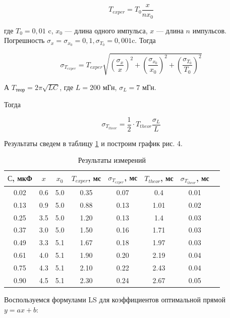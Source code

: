 \begin{equation}\label{}
T_{exper} = T_0 \frac{x}{nx_0}
\end{equation}

где $ T_0 = 0,01 $ c, $ x_0 $ --- длина одного импульса, $ x $ --- длина $ n $ импульсов. Погрешность $ \sigma_x = \sigma_{x_0} = 0,1, \sigma_{T_0} = 0,001  $c. Тогда 

\begin{equation}\label{}
\sigma_{T_{exper}} = T_{exper}\sqrt{ \left( \frac{ \sigma_x}{x} \right)^2 + \left( \frac{ \sigma_{x_0}}{x_0} \right)^2  +  \left( \frac{ \sigma_{T_0}}{T_0} \right)^2}
\end{equation}

А $ T_{теор} = 2\pi\sqrt{LC} $, где ${L = 200}$ мГн, $ \sigma_L = 7 $ мГн.

Тогда 

\begin{equation}\label{}
	\sigma_{T_{theor}} = \frac{1}{2}\cdot{T_{theor}} \frac{\sigma_L}{L}
\end{equation}

Результаты сведем в таблицу \ref{resT} и построим график рис. 4. 

\begin{table}[h!]
	\centering
	\caption{Результаты измерений}
	\begin{tabular}{|c|c|c|c|c|c|c|c|}
		\hline
		$С$, мкФ & $x$ & $x_0$ & $T_{exper}$, мс & $\sigma_{T_{exper}}$, мс & $T_{theor}$, мс & $ \sigma_{T_{theor}} $, мс \\
		\hline
		0.02 & 0.6 & 5.0 & 0.35 & 0.07 & 0.4 & 0.01 \\
		0.13 & 0.9 & 5.0 & 0.88 & 0.13 & 1.01 & 0.02 \\
		0.25 & 3.5 & 5.0 & 1.20 & 0.13 & 1.4 & 0.03 \\
		0.37 & 3.0 & 5.0 & 1.50 & 0.16 & 1.71 & 0.03 \\
		0.49 & 3.3 & 5.1 & 1.67 & 0.18 & 1.97 & 0.03 \\
		0.61 & 4.0 & 5.1 & 1.90 & 0.20 & 2.19 & 0.04 \\
		0.75 & 4.3 & 5.1 & 2.10 & 0.22 & 2.43 & 0.04 \\
		0.90 & 4.5 & 5.1 & 2.30 & 0.24 & 2.67 & 0.05 \\
		\hline
	\end{tabular}%
\label{resT}%
\end{table}%

Воспользуемся формулами LS для коэффициентов оптимальной прямой $y = ax + b$:



